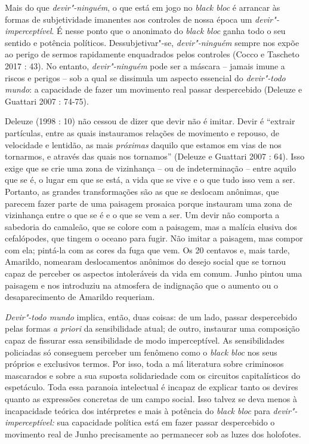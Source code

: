 Mais do que \emph{devir"-ninguém}, o que está em jogo no \emph{black bloc
}é arrancar às formas de subjetividade imanentes aos controles de nossa
época um \emph{devir"-imperceptível}. É nesse ponto que o anonimato do
\emph{black bloc} ganha todo o seu sentido e potência políticos.
Dessubjetivar"-se, \emph{devir"-ninguém} sempre nos expõe ao perigo de
sermos rapidamente enquadrados pelos controles (Cocco e Tascheto 2017 :
43). No entanto, \emph{devir"-ninguém} pode ser a máscara -- jamais imune
a riscos e perigos -- sob a qual se dissimula um aspecto essencial do
\emph{devir"-todo mundo}: a capacidade de fazer um movimento real passar
despercebido (Deleuze e Guattari 2007 : 74-75).

Deleuze (1998 : 10) não cessou de dizer que devir não é imitar. Devir é
``extrair partículas, entre as quais instauramos relações de movimento e
repouso, de velocidade e lentidão, as mais\emph{ próximas }daquilo que
estamos em vias de nos tornarmos, e através das quais nos tornamos''
(Deleuze e Guattari 2007 : 64). Isso exige que se crie uma zona de
vizinhança -- ou de indeterminação -- entre aquilo que se é, o lugar em
que se está, a vida que se vive e o que tudo isso vem a ser. Portanto,
as grandes transformações são as que se deslocam anônimas, que parecem
fazer parte de uma paisagem prosaica porque instauram uma zona de
vizinhança entre o que se é e o que se vem a ser. Um devir não comporta
a sabedoria do camaleão, que se colore com a paisagem, mas a malícia
elusiva dos cefalópodes, que tingem o oceano para fugir. Não imitar a
paisagem, mas compor com ela; pintá-la com as cores da fuga que vem. Os
20 centavos e, mais tarde, Amarildo, nomearam deslocamentos anônimos do
desejo social que se tornou capaz de perceber os aspectos intoleráveis
da vida em comum. Junho pintou uma paisagem e nos introduziu na
atmosfera de indignação que o aumento ou o desaparecimento de Amarildo
requeriam.

\emph{Devir"-todo mundo} implica, então, duas coisas: de um lado, passar
despercebido pelas formas \emph{a priori} da sensibilidade atual; de
outro, instaurar uma composição capaz de fissurar essa sensibilidade de
modo imperceptível. As sensibilidades policiadas só conseguem perceber
um fenômeno como o \emph{black bloc} nos seus próprios e exclusivos
termos. Por isso, toda a má literatura sobre criminosos mascarados e
sobre a sua suposta solidariedade com os circuitos capitalísticos do
espetáculo. Toda essa paranoia intelectual é incapaz de explicar tanto
os devires quanto as expressões concretas de um campo social. Isso
talvez se deva menos à incapacidade teórica dos intérpretes e mais à
potência do \emph{black bloc }para \emph{devir"-imperceptível:} sua
capacidade política está em fazer passar despercebido o movimento real
de Junho precisamente ao permanecer sob as luzes dos holofotes.

